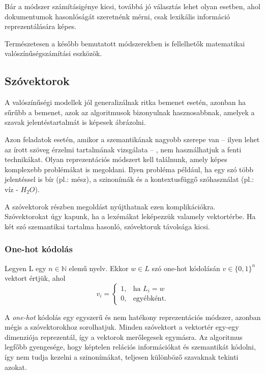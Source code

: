 Bár a módszer számításigénye kicsi, továbbá jó választás lehet olyan esetben, ahol dokumentumok hasonlóságát szeretnénk mérni, csak lexikális információ reprezentálására képes. 

\begin{note}
	Természetesen a később bemutatott módszerekben is fellelhetők matematikai valószínűségszámítási eszközök.
\end{note}

\subsection{Szóvektorok}

A valószínűségi modellek jól generalizálnak ritka bemenet esetén, azonban ha sűrűbb a bemenet, azok az algoritmusok bizonyulnak hasznosabbnak, amelyek a szavak jelentéstartalmát is képesek ábrázolni.

Azon feladatok esetén, amikor a szemantikának nagyobb szerepe van – ilyen lehet az írott szöveg érzelmi tartalmának vizsgálata – , nem használhatjuk a fenti technikákat. Olyan reprezentációs módszert kell találnunk, amely képes komplexebb problémákat is megoldani. Ilyen probléma például, ha egy szó több jelentéssel is bír (pl.: mész), a szinonímák és a kontextusfüggő szóhasználat (pl.: víz - $H_2O$).

A szóvektorok részben megoldást nyújthatnak ezen komplikációkra. Szóvektorokat úgy kapunk, ha a lexémákat leképezzük valamely vektortérbe. Ha két szó szemantikai tartalma hasonló, szóvektoruk távolsága kicsi.

\subsubsection{One-hot kódolás}

\begin{definition}
Legyen L egy $n \in \mathbb{N}$ elemű nyelv. Ekkor $w \in L$ szó one-hot kódolásán $v \in \{0,1\}^n$ vektort értjük, ahol 
\[
v_i= 
\begin{cases}
1,				& \text{ha } L_i = w\\
0,              & \text{egyébként.}
\end{cases}
\]
\end{definition}

A \textit{one-hot} kódolás egy egyszerű és nem hatékony reprezentációs módszer, azonban mégis a szóvektorokhoz sorolhatjuk. Minden szóvektort a vektortér egy-egy dimenziója reprezentál, így a vektorok merőlegesek egymásra. Az algoritmus legfőbb gyengesége, hogy képtelen relációs információkat és szemantikát  kódolni, így nem tudja kezelni a szinonímákat, teljesen különböző szavaknak tekinti azokat.

